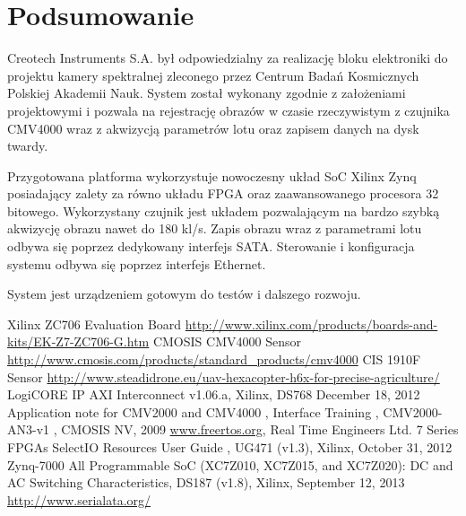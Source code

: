\documentclass[a4paper,11pt,oneside]{report}  %
\begin{document}


\chapter{Podsumowanie}
Creotech Instruments S.A. był odpowiedzialny za realizację bloku elektroniki do projektu kamery spektralnej zleconego przez Centrum Badań Kosmicznych Polskiej Akademii Nauk. System został wykonany zgodnie z założeniami projektowymi i pozwala na rejestrację obrazów w czasie rzeczywistym z czujnika CMV4000 wraz z akwizycją parametrów lotu oraz zapisem danych na dysk twardy. 

Przygotowana platforma wykorzystuje nowoczesny układ SoC Xilinx Zynq posiadający zalety za równo układu FPGA oraz zaawansowanego procesora 32 bitowego. Wykorzystany czujnik jest układem pozwalającym na bardzo szybką akwizycję obrazu nawet do 180 kl/s. Zapis obrazu wraz z parametrami lotu odbywa się poprzez dedykowany interfejs SATA. Sterowanie i konfiguracja systemu odbywa się poprzez interfejs Ethernet.

System jest urządzeniem gotowym do testów i dalszego rozwoju. 









\begin{thebibliography}{9}
 Xilinx ZC706 Evaluation Board \url{http://www.xilinx.com/products/boards-and-kits/EK-Z7-ZC706-G.htm}
 CMOSIS CMV4000 Sensor \url{http://www.cmosis.com/products/standard\_products/cmv4000}
 CIS 1910F Sensor
 \url{http://www.steadidrone.eu/uav-hexacopter-h6x-for-precise-agriculture/}
  LogiCORE IP AXI Interconnect v1.06.a, Xilinx, DS768 December 18, 2012
 Application note for CMV2000 and CMV4000 , Interface Training , CMV2000-AN3-v1 , CMOSIS NV, 2009
  \url{www.freertos.org}, Real Time Engineers Ltd.
 7 Series FPGAs SelectIO Resources User Guide , UG471 (v1.3), Xilinx, October 31, 2012
 Zynq-7000 All Programmable SoC (XC7Z010, XC7Z015, and XC7Z020): DC and AC Switching Characteristics, DS187 (v1.8), Xilinx, September 12, 2013
\cite{SATA} \url{http://www.serialata.org/}
\end{thebibliography}
\end{document}
